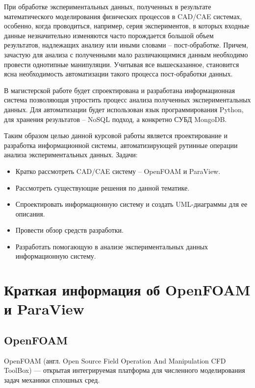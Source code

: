\documentclass[14pt]{extreport}
\begin{document}
	\lstset{ %
		language=Python,                %
		numbers=left,                   %
		basicstyle=\scriptsize,
		inputencoding=utf8,
		extendedchars=\true
	}



\tableofcontents

\intro

При обработке экспериментальных данных, полученных в результате математического моделирования физических процессов в CAD/CAE системах, особенно, когда проводиться, например, серия экспериментов, в которых входные данные незначительно изменяются часто порождается большой объем результатов, надлежащих анализу или иными словами -- пост-обработке. Причем, зачастую для анализа с полученными мало различающимися данным необходимо провести однотипные манипуляции. Учитывая все вышесказанное, становится ясна необходимость автоматизации такого процесса пост-обработки данных. 

В магистерской работе будет спроектирована и разработана информационная система позволяющая упростить процесс анализа полученных экспериментальных данных. Для автоматизации будет использован язык программирования Python, для хранения результатов -- NoSQL подход, а конкретно СУБД MongoDB. 

Таким образом целью данной курсовой работы является проектирование и разработка информационной системы, автоматизирующей рутинные операции анализа экспериментальных данных.
Задачи:
\begin{itemize}
\item Кратко рассмотреть CAD/CAE систему -- OpenFOAM и ParaView.
\item Рассмотреть существующие решения по данной тематике.
\item Спроектировать информационную систему и создать UML-диаграммы для ее описания.
\item Провести обзор средств разработки.
\item Разработать помогающую в анализе экспериментальных данных информационную систему.
\end{itemize}

\chapter{Краткая информация об OpenFOAM и ParaView}
\section{OpenFOAM}
OpenFOAM (англ. Open Source Field Operation And Manipulation CFD ToolBox) — открытая интегрируемая платформа для численного моделирования задач механики сплошных сред. ~\cite{OpenfoamWiki}
\end{document}
